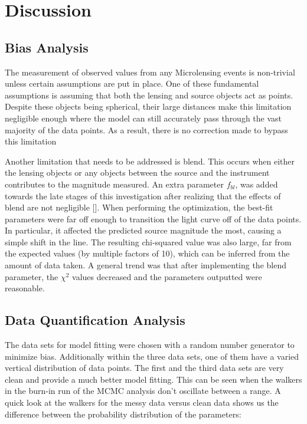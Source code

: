 \documentclass{article}
\begin{document}
\section{Discussion}
\subsection{Bias Analysis}

The measurement of observed values from any Microlensing events is non-trivial unless certain assumptions are put in place. One of these fundamental assumptions is assuming that both the lensing and source objects act as points. Despite these objects being spherical, their large distances make this limitation negligible enough where the model can still accurately pass through the vast majority of the data points. As a result, there is no correction made to bypass this limitation

Another limitation that needs to be addressed is blend. This occurs when either the lensing objects or any objects between the source and the instrument contributes to the magnitude measured. An extra parameter $f_{bl}$, was added towards the late stages of this investigation after realizing that the effects of blend are not negligible [\cite{Wyrzykowski}]. When performing the optimization, the best-fit parameters were far off enough to transition the light curve off of the data points. In particular, it affected the predicted source magnitude the most, causing a simple shift in the line. The resulting chi-squared value was also large, far from the expected values (by multiple factors of 10), which can be inferred from the amount of data taken. A general trend was that after implementing the blend parameter, the $\chi^2$ values decreased and the parameters outputted were reasonable.  


\subsection{Data Quantification Analysis}
The data sets for model fitting were chosen with a random number generator to minimize bias. Additionally within the three data sets, one of them have a varied vertical distribution of data points. The first and the third data sets are very clean and provide a much better model fitting. This can be seen when the walkers in the burn-in run of the MCMC analysis don't oscillate between a range. A quick look at the walkers for the messy data versus clean data shows us the difference between the probability distribution of the parameters:
\end{document}
